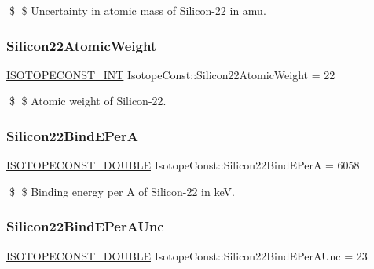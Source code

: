 \$ \$ Uncertainty in atomic mass of Silicon-\/22 in amu. \mbox{\label{group___isotope_const-_silicon-_si22_ga3366592ffab44871f9200a1e8b44d1ab}} 
\subsubsection{\texorpdfstring{Silicon22\+Atomic\+Weight}{Silicon22AtomicWeight}}
{\footnotesize\ttfamily \mbox{\hyperlink{group___isotope_const-_macros_ga5f18360b3e99483a35c32d789e62621c}{I\+S\+O\+T\+O\+P\+E\+C\+O\+N\+S\+T\+\_\+\+I\+NT}} Isotope\+Const\+::\+Silicon22\+Atomic\+Weight = 22}

\$ \$ Atomic weight of Silicon-\/22. \mbox{\label{group___isotope_const-_silicon-_si22_ga61ec11eebba4bf9b1d8ddc02a9b3c516}} 
\subsubsection{\texorpdfstring{Silicon22\+Bind\+E\+PerA}{Silicon22BindEPerA}}
{\footnotesize\ttfamily \mbox{\hyperlink{group___isotope_const-_macros_ga8f45a7272ce02c0b4c65c44636ed719a}{I\+S\+O\+T\+O\+P\+E\+C\+O\+N\+S\+T\+\_\+\+D\+O\+U\+B\+LE}} Isotope\+Const\+::\+Silicon22\+Bind\+E\+PerA = 6058}

\$ \$ Binding energy per A of Silicon-\/22 in keV. \mbox{\label{group___isotope_const-_silicon-_si22_ga89d34443002e1be22e5ef174ac0322c5}} 
\subsubsection{\texorpdfstring{Silicon22\+Bind\+E\+Per\+A\+Unc}{Silicon22BindEPerAUnc}}
{\footnotesize\ttfamily \mbox{\hyperlink{group___isotope_const-_macros_ga8f45a7272ce02c0b4c65c44636ed719a}{I\+S\+O\+T\+O\+P\+E\+C\+O\+N\+S\+T\+\_\+\+D\+O\+U\+B\+LE}} Isotope\+Const\+::\+Silicon22\+Bind\+E\+Per\+A\+Unc = 23}

